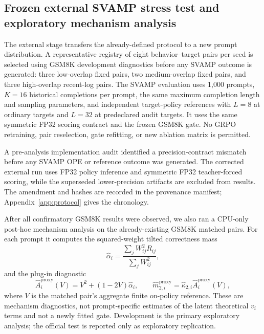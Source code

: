 \documentclass[10pt]{article}
\theoremstyle{remark}
\begin{document}
\subsection{Frozen external SVAMP stress test and exploratory mechanism analysis}
The external stage transfers the already-defined protocol to a new prompt distribution. A representative registry of eight behavior--target pairs per seed is selected using GSM8K development diagnostics before any SVAMP outcome is generated: three low-overlap fixed pairs, two medium-overlap fixed pairs, and three high-overlap recent-log pairs. The SVAMP evaluation uses 1,000 prompts, $K=16$ historical completions per prompt, the same maximum completion length and sampling parameters, and independent target-policy references with $L=8$ at ordinary targets and $L=32$ at predeclared audit targets. It uses the same symmetric FP32 scoring contract and the frozen GSM8K gate. No GRPO retraining, pair reselection, gate refitting, or new ablation matrix is permitted.

A pre-analysis implementation audit identified a precision-contract mismatch before any SVAMP OPE or reference outcome was generated. The corrected external run uses FP32 policy inference and symmetric FP32 teacher-forced scoring, while the superseded lower-precision artifacts are excluded from results. The amendment and hashes are recorded in the provenance manifest; Appendix~\ref{app:protocol} gives the chronology.

After all confirmatory GSM8K results were observed, we also ran a CPU-only post-hoc mechanism analysis on the already-existing GSM8K matched pairs. For each prompt it computes the squared-weight tilted correctness mass
\begin{equation}
\widehat\alpha_i=\frac{\sum_jW_{ij}^2R_{ij}}{\sum_jW_{ij}^2},
\label{eq:alphahat}
\end{equation}
and the plug-in diagnostic
\begin{equation}
\widehat A_i^{\mathrm{proxy}}(V)=V^2+(1-2V)\widehat\alpha_i,
\qquad
\widehat m_{2,i}^{\mathrm{proxy}}=\widehat\kappa_{2,i}\widehat A_i^{\mathrm{proxy}}(V),
\end{equation}
where $V$ is the matched pair's aggregate finite on-policy reference. These are mechanism diagnostics, not prompt-specific estimates of the latent theoretical $v_i$ terms and not a newly fitted gate. Development is the primary exploratory analysis; the official test is reported only as exploratory replication.
\end{document}
